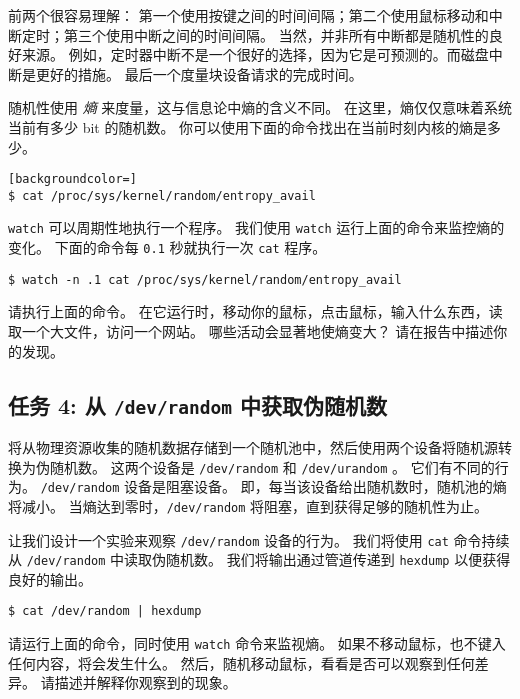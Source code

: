 前两个很容易理解：
第一个使用按键之间的时间间隔；第二个使用鼠标移动和中断定时；第三个使用中断之间的时间间隔。
当然，并非所有中断都是随机性的良好来源。
例如，定时器中断不是一个很好的选择，因为它是可预测的。而磁盘中断是更好的措施。
最后一个度量块设备请求的完成时间。


随机性使用 {\em 熵} 来度量，这与信息论中熵的含义不同。
在这里，熵仅仅意味着系统当前有多少 bit 的随机数。
你可以使用下面的命令找出在当前时刻内核的熵是多少。

\begin{lstlisting}[backgroundcolor=]
$ cat /proc/sys/kernel/random/entropy_avail
\end{lstlisting}

\texttt{watch} 可以周期性地执行一个程序。
我们使用 \texttt{watch} 运行上面的命令来监控熵的变化。
下面的命令每 \texttt{0.1} 秒就执行一次 \texttt{cat} 程序。

\begin{lstlisting}
$ watch -n .1 cat /proc/sys/kernel/random/entropy_avail
\end{lstlisting}

请执行上面的命令。
在它运行时，移动你的鼠标，点击鼠标，输入什么东西，读取一个大文件，访问一个网站。
哪些活动会显著地使熵变大？
请在报告中描述你的发现。




\subsection{任务 4: 从 \texttt{/dev/random} 中获取伪随机数}


{\linux} 将从物理资源收集的随机数据存储到一个随机池中，然后使用两个设备将随机源转换为伪随机数。
这两个设备是 \texttt{/dev/random} 和 \texttt{/dev/urandom} 。
它们有不同的行为。
\texttt{/dev/random} 设备是阻塞设备。
即，每当该设备给出随机数时，随机池的熵将减小。
当熵达到零时，\texttt{/dev/random} 将阻塞，直到获得足够的随机性为止。


让我们设计一个实验来观察 \texttt{/dev/random} 设备的行为。
我们将使用 \texttt{cat} 命令持续从 \texttt{/dev/random} 中读取伪随机数。
我们将输出通过管道传递到 \texttt{hexdump} 以便获得良好的输出。


\begin{lstlisting}
$ cat /dev/random | hexdump
\end{lstlisting}


请运行上面的命令，同时使用 \texttt{watch} 命令来监视熵。
如果不移动鼠标，也不键入任何内容，将会发生什么。
然后，随机移动鼠标，看看是否可以观察到任何差异。
请描述并解释你观察到的现象。


